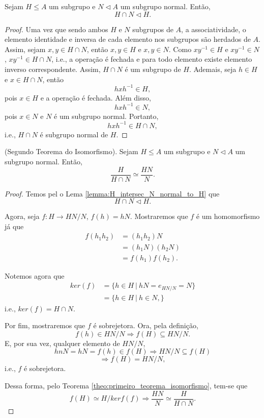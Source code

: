 \documentclass[11pt,openany]{book}
\begin{document}
    \begin{lemma}
    \label{lemma:H_intersec_N_normal_to_H}
        Sejam $H \leq A$ um subgrupo e $N \triangleleft A$ um subgrupo normal. Então,
    \[{H \cap N} \triangleleft H.\]
    \end{lemma}
    \begin{proof}
        Uma vez que sendo ambos $H$ e $N$ subgrupos de $A$, a associatividade, o elemento identidade e inversa de cada elemento nos subgrupos são herdados de $A$. Assim, sejam $x, y \in H \cap N$, então $x, y \in H$ e $x, y \in N$. Como $xy^{-1} \in H$ e $xy^{-1} \in N$, $xy^{-1} \in H \cap N$, i.e., a operação é fechada e para todo elemento existe elemento inverso correspondente. Assim, $H \cap N$ é um subgrupo de $H$. Ademais, seja $h \in H$ e $x \in H \cap N$, então
        \[hxh^{-1} \in H,\]
        pois $x \in H$ e a operação é fechada. Além disso,
        \[hxh^{-1} \in N,\]
        pois $x \in N$ e $N$ é um subgrupo normal.
        Portanto,
        \[hxh^{-1} \in H \cap N,\]
        i.e., $H \cap N$ é subgrupo normal de $H$.
    \end{proof}

    \begin{theorem}
    \label{theo:segundo_teorema_isomorfismo}
    (Segundo Teorema do Isomorfismo). Sejam $H \leq A$ um subgrupo e $N \triangleleft A$ um subgrupo normal. Então,
    \[\frac{H}{H \cap N} \simeq \frac{HN}{N}.\]
    \end{theorem}
    
    \begin{proof}
    Temos pel o Lema \ref{lemma:H_intersec_N_normal_to_H} que
    \[H \cap N \triangleleft H.\]
    
    Agora, seja $f:H \rightarrow HN/N$, $f(h) = hN$. Mostraremos que $f$ é um homomorfismo já que
    \begin{align*}
        f(h_1h_2) &= (h_1h_2)N \\
        &= (h_1N)(h_2N) \\
        &= f(h_1)f(h_2).
    \end{align*}

    Notemos agora que
    \begin{align*}
        ker(f) &= \{h \in H \ | \ hN = e_{HN/N} = N\} \\
        &= \{h \in H \ | \ h \in N,\}
    \end{align*}
    i.e., $ker(f) = H \cap N$.

    Por fim, mostraremos que $f$ é sobrejetora. Ora, pela definição,
    \[f(h) \in HN/N \Rightarrow f(H) \subseteq HN/N.\]
    E, por sua vez, qualquer elemento de $HN/N$,
    \[hnN = hN = f(h) \in f(H) \Rightarrow HN/N \subseteq f(H)\]
    \[\Rightarrow f(H) = HN/N,\]
    i.e., $f$ é sobrejetora.

    Dessa forma, pelo Teorema \ref{theo:primeiro_teorema_isomorfismo}, tem-se que
    \[f(H) \simeq H/kerf(f) \Rightarrow \frac{HN}{N} \simeq \frac{H}{H \cap N}.\]
    \end{proof}
\end{document}
